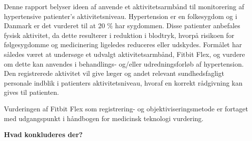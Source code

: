Denne rapport belyser ideen af anvende et aktivitetsarmbånd til monitorering af hypertensive patienter's aktivitetsniveau. 
Hypertension er en folkesygdom og i Danmark er det vurderet til at 20 \% har sygdommen. Disse patienter anbefales fysisk aktivitet, da dette resulterer i reduktion i blodtryk, hvorpå risikoen for følgesygdomme og medicinering ligeledes reduceres eller udskydes. 
Formålet har således været at undersøge et udvalgt aktivitetsarmbånd, Fitbit Flex, og vurdere om dette kan anvendes i behandlings- og/eller udredningsforløb af hypertension. 
Den registrerede aktivitet vil give læger og andet relevant sundhedsfagligt personale indblik i patienters aktivitetsniveau, hvoraf en korrekt rådgivning kan gives til patienten. 

Vurderingen af Fitbit Flex som registrering- og objektiviseringsmetode er fortaget med udgangspunkt i håndbogen for medicinsk teknologi vurdering.  

\vspace{5cm}

\textbf{Hvad konkluderes der?}